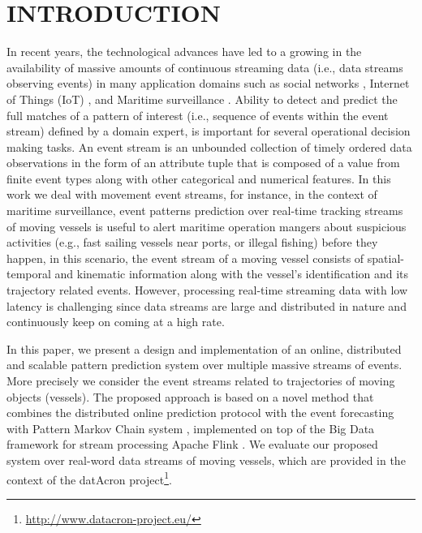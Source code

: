\section{INTRODUCTION}


In recent years, the technological advances have led to a growing in the availability of massive amounts of continuous streaming data (i.e., data streams observing events) in many application domains such as social networks \cite{mathioudakis2010twittermonitor}, Internet of Things (IoT) \cite{miorandi2012internet}, and Maritime surveillance \cite{patroumpas2015event}. Ability to detect and predict the full matches of a pattern of interest (i.e., sequence of events within the event stream) defined by a domain expert, is important for several operational decision making tasks.
An event stream is an unbounded collection of timely ordered data observations in the form of an attribute tuple that is composed of a value from finite event types along with other categorical and numerical features. In this work we deal with movement event streams, for instance, in the context of maritime surveillance, event patterns prediction over real-time tracking streams of moving vessels is useful to alert maritime operation mangers about suspicious activities (e.g., fast sailing vessels near ports, or illegal fishing) before they happen, in this scenario, the event stream of a moving vessel consists of spatial-temporal and kinematic information along with the vessel's identification and its trajectory related events. However, processing real-time streaming data with low latency is challenging since data streams are large and distributed in nature and continuously keep on coming at a high rate. 
\par In this paper, we present a design and implementation of an online, distributed and scalable pattern prediction system over multiple massive streams of events. More precisely we consider the event streams related to trajectories of moving objects (vessels). The proposed approach is based on a novel method that combines the distributed online prediction protocol \cite{dekel2012optimal,kamp2014communication} with the event forecasting with Pattern Markov Chain system \cite{alevizos2017event}, implemented on top of the Big Data framework for stream processing Apache Flink \cite{Flink}. We evaluate our proposed system over  real-word data streams of moving vessels, which are provided in the context of the datAcron project\footnote{\url{http://www.datacron-project.eu/}}.